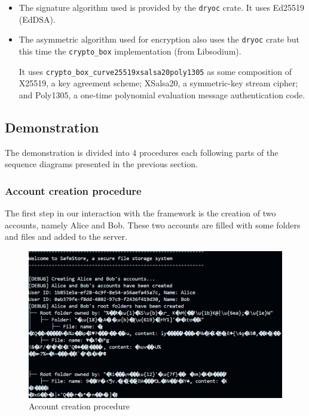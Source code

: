 \begin{itemize}
    \item The signature algorithm used is provided by the \lstinline{dryoc} crate\cite{dryocsign}. It uses Ed25519 (EdDSA).
    \item The asymmetric algorithm used for encryption also uses the \lstinline{dryoc} crate but this time the \lstinline{crypto_box} implementation (from Libsodium)\cite{cryptobox}. 
    
    It uses \lstinline{crypto_box_curve25519xsalsa20poly1305} as some composition of X25519, a key agreement scheme; XSalsa20, a symmetric-key stream cipher; and Poly1305, a one-time polynomial evaluation message authentication code\cite{libsodium}\cite{libsodiumcrypto}.
\end{itemize}

\subsection{Demonstration}
The demonstration is divided into 4 procedures each following parts of the sequence diagrams presented in the previous section. 
\subsubsection{Account creation procedure}
The first step in our interaction with the framework is the creation of two accounts, namely Alice and Bob. These two accounts are filled with some folders and files and added to the server. 

\begin{figure}[ht]
    \centering
    \includegraphics[width=\textwidth]{screenshots/create_procedure.png}
    \caption{Account creation procedure}
    \label{fig:create_procedure}
\end{figure}

